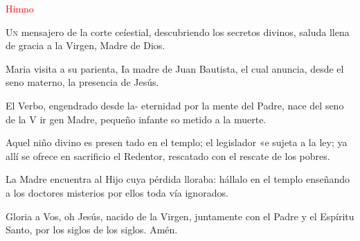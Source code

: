 \vspace{0.25em}

\begin{center}
      \textcolor{red}{Himno}
\end{center}

\vspace{-0.5em}

\lettrine[lines=2]{U}n mensajero de la corte ceíestial, descubriendo los se­cretos divinos, saluda llena de gracia a la Virgen, Madre de Dios.

Maria visita a su parienta, Ia madre de Juan Bautista, el cual anuncia, desde el seno materno, la presencia de Jesús.

El Verbo, engendrado desde la- eternidad por la mente del Padre, nace del seno de la V ir ­gen Madre, pequeño infante so­ metido a la muerte.

Aquel niño divino es presen­ tado en el templo; el legislador «e sujeta a la ley; ya allí se ofrece en sacrificio el Redentor, 
rescatado con el rescate de los pobres.

La Madre encuentra al Hijo cuya pérdida lloraba: hállalo en el templo enseñando a los doctores misterios por ellos toda­ vía ignorados.

Gloria a Vos, oh Jesús, naci­do de la Virgen, juntamente con el Padre y el Espíritu Santo, por los siglos de los siglos. Amén.

\vspace{0.5em}

\begin{otherlanguage}{latin}
      

      \vspace{0.25em}

      

      \vspace{0.25em}

      

      \vspace{0.25em}

      
\end{otherlanguage}